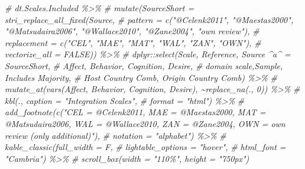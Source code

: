 \documentclass[
]{article}
\newenvironment{Shaded}{\begin{snugshade}}{\end{snugshade}}
\newcommand{\CommentTok}[1]{\textcolor[rgb]{0.56,0.35,0.01}{\textit{#1}}}
\begin{document}
\begin{Shaded}
\begin{Highlighting}[]
\CommentTok{\# dt.Scales.Included \%\textgreater{}\%}
\CommentTok{\#   mutate(SourceShort = stri\_replace\_all\_fixed(Source,}
\CommentTok{\#                                          pattern = c("@Celenk2011", "@Maestas2000", "@Matsudaira2006", "@Wallace2010", "@Zane2004", "own review"), }
\CommentTok{\#                                          replacement = c("CEL", "MAE", "MAT", "WAL", "ZAN", "OWN"), }
\CommentTok{\#                                          vectorize\_all = FALSE)) \%\textgreater{}\%}
\CommentTok{\#   dplyr::select(Scale, Reference, \textasciigrave{}Source \^{}a\^{}\textasciigrave{} = SourceShort, }
\CommentTok{\#                 Affect,   Behavior,   Cognition,  Desire,}
\CommentTok{\#                 \textasciigrave{}domain scale\textasciigrave{},Sample,    \textasciigrave{}Includes Majority\textasciigrave{}, }
\CommentTok{\#                 \textasciigrave{}Host Country Comb\textasciigrave{},  \textasciigrave{}Origin Country Comb\textasciigrave{}) \%\textgreater{}\%}
\CommentTok{\#   mutate\_at(vars(Affect,  Behavior,   Cognition, Desire), \textasciitilde{}replace\_na(., 0)) \%\textgreater{}\%}
\CommentTok{\#   kbl(., caption = "Integration Scales",}
\CommentTok{\#       format = "html") \%\textgreater{}\%}
\CommentTok{\#   add\_footnote(c("CEL = @Celenk2011, MAE = @Maestas2000, MAT = @Matsudaira2006, WAL = @Wallace2010, ZAN = @Zane2004, OWN = own review (only additional)"), }
\CommentTok{\#                notation = "alphabet") \%\textgreater{}\%}
\CommentTok{\#   kable\_classic(full\_width = F, }
\CommentTok{\#                 lightable\_options = "hover", }
\CommentTok{\#                 html\_font = "Cambria") \%\textgreater{}\%}
\CommentTok{\#    scroll\_box(width = "110\%", height = "750px")}


\end{Highlighting}
\end{Shaded}
\end{document}
